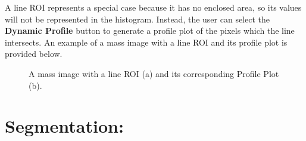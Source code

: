 \documentclass{article}
\begin{document}
	A line ROI represents a special case because it has no enclosed area, so its values will
	not be represented in the histogram. Instead, the user can select the \textbf{Dynamic
	Profile} button to generate a profile plot of the pixels which the line intersects. An
	example of a mass image with a line ROI and its profile plot is provided below.

	\begin{figure}[h]
	\centering
	\hfill
	\caption{A mass image with a line ROI (a) and its corresponding Profile Plot (b).}
	\end{figure}
	\clearpage

\newpage
\section*{Segmentation:}
	
\end{document}
